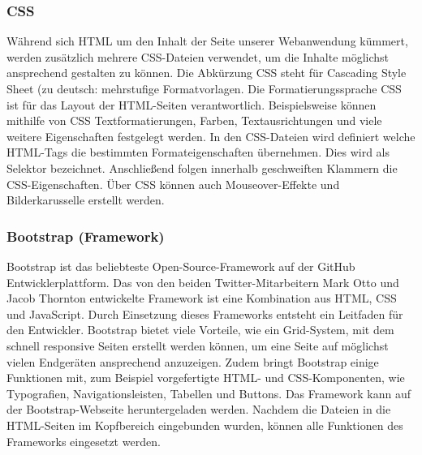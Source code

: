 	    \subsubsection{CSS}
	    Während sich \ac{HTML} um den Inhalt der Seite unserer Webanwendung kümmert, werden zusätzlich mehrere \acs{CSS}-Dateien verwendet, um die Inhalte möglichst ansprechend gestalten zu können. Die Abkürzung \acs{CSS} steht für Cascading Style Sheet (zu deutsch: mehrstufige Formatvorlagen\autocite[Vgl.][]{CSS}. Die Formatierungssprache \acs{CSS} ist für das Layout der HTML-Seiten verantwortlich. Beispielsweise können mithilfe von \acs{CSS} Textformatierungen, Farben, Textausrichtungen und viele weitere Eigenschaften festgelegt werden. In den \acs{CSS}-Dateien wird definiert welche HTML-Tags die bestimmten Formateigenschaften übernehmen. Dies wird als Selektor bezeichnet. Anschließend folgen innerhalb geschweiften Klammern die \acs{CSS}-Eigenschaften. Über \acs{CSS} können auch Mouseover-Effekte und Bilderkarusselle erstellt werden.  
	    
	    \subsubsection{Bootstrap (Framework)}
	    Bootstrap ist das beliebteste Open-Source-Framework auf der GitHub Entwicklerplattform.  Das von den beiden Twitter-Mitarbeitern Mark Otto und Jacob Thornton entwickelte Framework ist eine Kombination aus HTML, \acs{CSS} und JavaScript.\autocite[Vgl.][]{Bootstrap} Durch Einsetzung dieses Frameworks entsteht ein Leitfaden für den Entwickler. Bootstrap bietet viele Vorteile, wie ein Grid-System, mit dem schnell responsive Seiten erstellt werden können, um eine Seite auf möglichst vielen Endgeräten ansprechend anzuzeigen. Zudem bringt Bootstrap einige Funktionen mit, zum Beispiel vorgefertigte HTML- und \acs{CSS}-Komponenten, wie Typografien, Navigationsleisten, Tabellen und Buttons. Das Framework kann auf der Bootstrap-Webseite heruntergeladen werden. Nachdem die Dateien in die HTML-Seiten im Kopfbereich eingebunden wurden, können alle Funktionen des Frameworks eingesetzt werden.
	    
